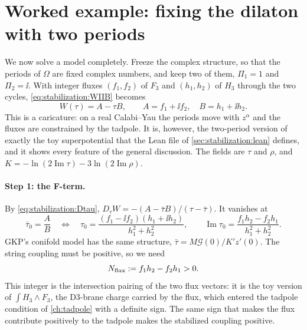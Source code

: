 \section{Worked example: fixing the dilaton with two periods}\label{sec:stabilization:worked}

We now solve a model completely. Freeze the complex structure, so that the periods of
$\Omega$ are fixed complex numbers, and keep two of them, $\Pi_1=1$ and $\Pi_2=\ii$. With
integer fluxes $(f_1,f_2)$ of $F_3$ and $(h_1,h_2)$ of $H_3$ through the two cycles,
\eqref{eq:stabilization:WIIB} becomes
\begin{equation}\label{eq:stabilization:toyW}
 W(\tau)=A-\tau B,\qquad A=f_1+\ii f_2,\quad B=h_1+\ii h_2 .
\end{equation}
This is a caricature: on a real Calabi--Yau the periods move with $z^\alpha$ and the fluxes are
constrained by the tadpole. It is, however, the two-period version of exactly the toy
superpotential that the Lean file of \cref{sec:stabilization:lean} defines, and it shows every
feature of the general discussion. The fields are $\tau$ and $\rho$, and
$K=-\ln(2\operatorname{Im}\tau)-3\ln(2\operatorname{Im}\rho)$.

\paragraph{Step 1: the F-term.} By \eqref{eq:stabilization:Dtau},
$D_\tau W=-(A-\bar\tau B)/(\tau-\bar\tau)$. It vanishes at
\begin{equation}\label{eq:stabilization:tau0}
 \bar\tau_0=\frac AB\quad\Longleftrightarrow\quad
 \tau_0=\frac{(f_1-\ii f_2)(h_1+\ii h_2)}{h_1^2+h_2^2},\qquad
 \operatorname{Im}\tau_0=\frac{f_1h_2-f_2h_1}{h_1^2+h_2^2}.
\end{equation}
GKP's conifold model has the same structure, $\bar\tau=M\mathcal G(0)/K'z'(0)$.
 The string coupling must be positive, so
we need
\begin{equation}\label{eq:stabilization:Nflux}
 N_{\rm flux}:=f_1h_2-f_2h_1>0 .
\end{equation}
This integer is the intersection pairing of the two flux vectors: it is the toy version of
$\int H_3\wedge F_3$, the D3-brane charge carried by the flux, which entered the tadpole
condition of \cref{ch:tadpole} with a definite sign.  The same sign that makes the flux contribute positively to the tadpole makes
the stabilized coupling positive.

